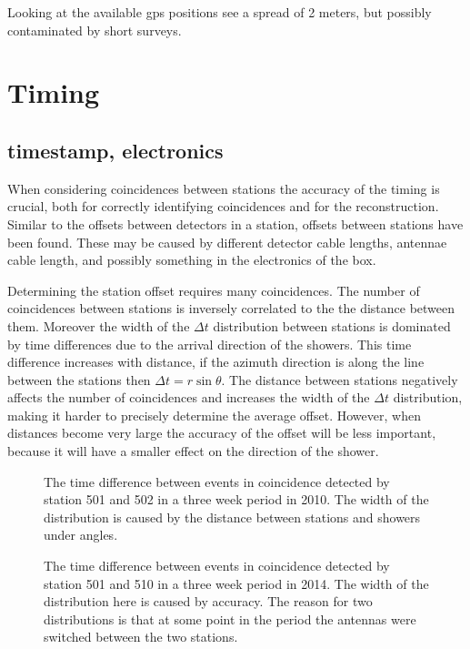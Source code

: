 Looking at the available gps positions see a spread of 2 meters, but possibly contaminated by short surveys.


\section{Timing}

\subsection{\gps timestamp, electronics}

When considering coincidences between stations the accuracy of the timing is crucial, both for correctly identifying coincidences and for the reconstruction. Similar to the offsets between detectors in a station, offsets between stations have been found. These may be caused by different detector cable lengths, \gps antennae cable length, and possibly something in the electronics of the \hisparc box.

Determining the station offset requires many coincidences. The number of coincidences between stations is inversely correlated to the the distance between them. Moreover the width of the $\Delta t$ distribution between stations is dominated by time differences due to the arrival direction of the showers. This time difference increases with distance, if the azimuth direction is along the line between the stations then $\Delta t = r \sin{\theta}$. The distance between stations negatively affects the number of coincidences and increases the width of the $\Delta t$ distribution, making it harder to precisely determine the average offset. However, when distances become very large the accuracy of the offset will be less important, because it will have a smaller effect on the direction of the shower.

\begin{figure}
    \centering
    
    \caption{ The
             time difference between events in coincidence detected by
             station 501 and 502 in a three week period in 2010. The
             width of the distribution is caused by the distance between
             stations and showers under angles.}
    \label{fig:station_offsets_501_502}
\end{figure}

\begin{figure}
    \centering
    
    \caption{ The
             time difference between events in coincidence detected by
             station 501 and 510 in a three week period in 2014. The
             width of the distribution here is caused by \gps accuracy.
             The reason for two distributions is that at some point in
             the period the \gps antennas were switched between the two
             stations.}
    \label{fig:station_offsets_501_510}
\end{figure}


